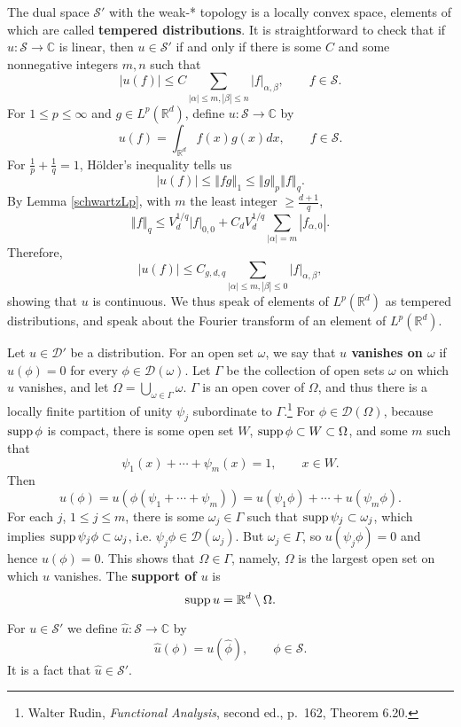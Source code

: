 \documentclass{article}
\newcommand{\supp}{\ensuremath\mathrm{supp}\,}
\newcommand{\norm}[1]{\left\Vert #1 \right\Vert}
\theoremstyle{definition}
\begin{document}
The dual space $\mathscr{S}'$ with the weak-*
topology is  a locally convex space, elements of which are called \textbf{tempered distributions}.
It is straightforward to check that if $u:\mathscr{S} \to \mathbb{C}$ is linear, then $u \in \mathscr{S}'$ if and only if
there is some  $C$ and some nonnegative integers $m,n$ such that
\[
|u(f)| \leq C \sum_{|\alpha| \leq m, |\beta| \leq n} |f|_{\alpha,\beta}, \qquad f \in \mathscr{S}.
\]
For $1 \leq p \leq \infty$ and $g \in L^p(\mathbb{R}^d)$,
define $u:\mathscr{S} \to \mathbb{C}$ by
\[
u(f) = \int_{\mathbb{R}^d} f(x) g(x) dx, \qquad f \in \mathscr{S}.
\]
For $\frac{1}{p}+\frac{1}{q}=1$, H\"older's inequality tells us
\[
|u(f)| \leq \norm{fg}_1 \leq \norm{g}_p \norm{f}_q.
\]
By Lemma \ref{schwartzLp}, with $m$ the least integer $\geq \frac{d+1}{q}$,
\[
\norm{f}_q \leq V_d^{1/q} |f|_{0,0} + C_d V_d^{1/q} \sum_{|\alpha|=m} |f_{\alpha,0}|.
\]
Therefore, 
\[
|u(f)| \leq C_{g,d,q} \sum_{|\alpha| \leq m, |\beta| \leq 0} |f|_{\alpha,\beta},
\]
showing that $u$ is continuous. 
We thus speak of elements of $L^p(\mathbb{R}^d)$ as tempered distributions, and
speak about the Fourier transform of an element of  $L^p(\mathbb{R}^d)$.

Let $u \in \mathscr{D}'$ be a distribution. For an open set $\omega$,
we say that \textbf{$u$ vanishes on $\omega$} if 
$u(\phi)=0$ for every $\phi \in \mathscr{D}(\omega)$. 
Let $\Gamma$ be the collection of open sets $\omega$ on which $u$ vanishes, and let
$\Omega = \bigcup_{\omega \in \Gamma} \omega$. 
$\Gamma$ is an open cover of $\Omega$, and
 thus there is a locally finite partition of unity $\psi_j$ subordinate to $\Gamma$.\footnote{Walter Rudin, {\em Functional
 Analysis}, second ed., p.~162, Theorem 6.20.}
For $\phi \in \mathscr{D}(\Omega)$, because 
$\supp \phi$ is compact,
there is some open set $W$, $\supp \phi \subset W \subset \Omega$, and some $m$ such that
\[
\psi_1(x)+\cdots+\psi_m(x)=1, \qquad x \in W.
\]
Then 
\[
u(\phi) = u(\phi(\psi_1+\cdots+\psi_m))
=u(\psi_1 \phi)+\cdots+u(\psi_m \phi).
\]
For each $j$, $1 \leq j \leq m$, there is some $\omega_j \in \Gamma$ such that $\supp \psi_j \subset \omega_j$,
which implies $\supp \psi_j \phi \subset \omega_j$, i.e.
$\psi_j \phi \in \mathscr{D}(\omega_j)$. But $\omega_j \in \Gamma$, so
$u(\psi_j \phi)=0$ and hence $u(\phi)=0$. This shows that $\Omega \in \Gamma$, namely, $\Omega$ is the largest
open set on which $u$ vanishes.
The \textbf{support of $u$} is
\[
\supp u = \mathbb{R}^d \setminus \Omega.
\]

For $u \in \mathscr{S}'$ we define $\hat{u}:\mathscr{S} \to \mathbb{C}$ by
\[
\hat{u}(\phi) = u(\hat{\phi}), \qquad \phi \in \mathscr{S}.
\]
It is a fact that $\hat{u} \in \mathscr{S}'$. 
\end{document}
